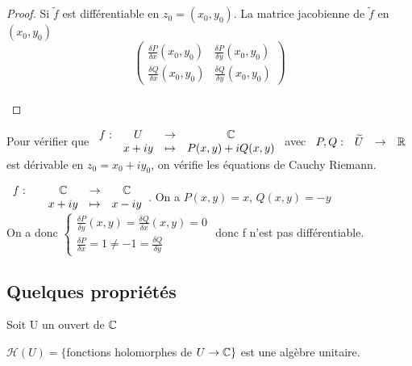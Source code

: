 \documentclass[]{report}
\begin{document}
\begin{proof}
    Si $\widetilde{f}$ est différentiable en $z_0=(x_0,y_0)$. La matrice jacobienne de $\widetilde{f}$ en $(x_0,y_0)$\\
    \[\begin{pmatrix}
\frac{\delta P}{\delta x}(x_0,y_0) & \frac{\delta P}{\delta y}(x_0,y_0) \\
\frac{\delta Q}{\delta x}(x_0,y_0) & \frac{\delta Q}{\delta y}(x_0,y_0)
    \end{pmatrix}\]\\
\end{proof}

\begin{re}
    Pour vérifier que $\begin{array}{ccccc}
f : & U & \to & \mathbb{C} \\
  & x+iy & \mapsto & P (x, y) + iQ (x, y)  
\end{array}$ avec $\begin{array}{ccccc}P,Q  : & \widetilde{U} & \to & \mathbb{R}\end{array}$ est dérivable en $z_0=x_0+iy_0$, on vérifie les équations de Cauchy Riemann.
\end{re}

\begin{ex}
    $\begin{array}{ccccc} f : & & \mathbb{C} & \to & \mathbb{C} \\ & & x+iy & \mapsto & x-iy \end{array}$. On a $P(x,y)=x$, $Q(x,y)=-y$\\
On a donc $\begin{cases} \frac{\delta P}{\delta y}(x,y)=\frac{\delta Q}{\delta x}(x,y)=0\\ \frac{\delta P}{\delta x}=1 \neq -1 = \frac{\delta Q}{\delta y} \end{cases}$ donc f n'est pas différentiable.
\end{ex}

\subsection{Quelques propriétés}

Soit U un ouvert de $\mathbb{C}$

\begin{df}
    $\mathcal{H}(U)=\{$fonctions holomorphes de $U \to \mathbb{C} \}$ est une algèbre unitaire.
\end{df}
\end{document}
